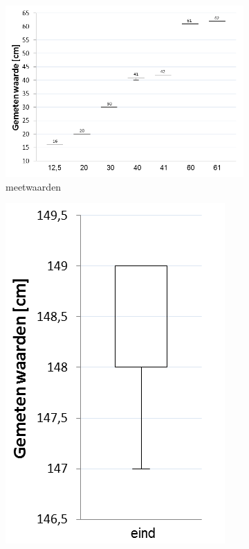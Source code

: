 \documentclass[tt3]{penoverslag}
\begin{document}
\begin{figure}
        \centering
        \begin{subfigure}[h]{0.69\textwidth}
                \centering
                \includegraphics[width=\textwidth]{boxUS}
                \caption{meetwaarden}
        \end{subfigure}%
        \begin{subfigure}[h]{0.31\textwidth}
                \centering
                \includegraphics[width=\textwidth]{boxUSeind}

\end{subfigure}
\end{figure}
\end{document}

